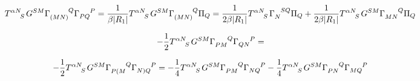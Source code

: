 \documentclass{article}
\begin{document}
\begin{align*}
    \tensor{T}{^\alpha^N_{S}}G^{SM}\tensor{\Gamma}{_{(MN)}^Q}\tensor{\Gamma}{_P_Q^P} = \frac{1}{\beta|R_1|}\tensor{T}{^\alpha^N_{S}}G^{SM}\tensor{\Gamma}{_{(MN)}^Q}\Pi_Q = \frac{1}{2\beta|R_1|}\tensor{T}{^\alpha^N_S}\tensor{\Gamma}{_N^S^Q}\Pi_Q+\frac{1}{2\beta|R_1|}\tensor{T}{^\alpha^N_S}G^{SM}\tensor{\Gamma}{_M_N^Q}\Pi_Q
\end{align*}

\begin{align*}
    -\frac{1}{2}\tensor{T}{^\alpha^N_S}G^{SM}\tensor{\Gamma}{_P_M^Q}\tensor{\Gamma}{_Q_N^P}= 
\end{align*}

\begin{align*}
    -\frac{1}{2}\tensor{T}{^\alpha^N_S}G^{SM}\tensor{\Gamma}{_{P(M}^Q}\tensor{\Gamma}{_{N)Q}^P} = -\frac{1}{4}\tensor{T}{^\alpha^N_S}G^{SM}\tensor{\Gamma}{_{PM}^Q}\tensor{\Gamma}{_{NQ}^P}-\frac{1}{4}\tensor{T}{^\alpha^N_S}G^{SM}\tensor{\Gamma}{_{PN}^Q}\tensor{\Gamma}{_{MQ}^P}
\end{align*}
\end{document}
